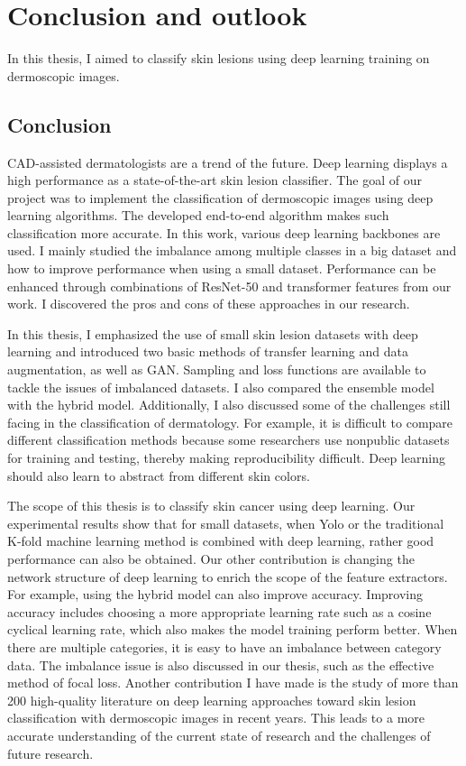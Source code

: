 
\chapter{Conclusion and outlook} \label{ch:conclusion}

In this thesis, I aimed to classify skin lesions using deep learning training on dermoscopic images.  
   

\section{Conclusion}
CAD-assisted dermatologists are a trend of the future. Deep learning displays a high performance as a state-of-the-art skin lesion classifier. The goal of our project was to implement the classification of dermoscopic images using deep learning algorithms. The developed end-to-end algorithm makes such classification more accurate. In this work, various deep learning backbones are used. I mainly studied the imbalance among multiple classes in a big dataset and how to improve performance when using a small dataset. Performance can be enhanced through combinations of ResNet-50 and transformer features from our work. I discovered the pros and cons of these approaches in our research. 

In this thesis, I emphasized the use of small skin lesion datasets with deep learning and introduced two basic methods of transfer learning and data augmentation, as well as GAN. Sampling and loss functions are available to tackle the issues of imbalanced datasets. I also compared the ensemble model with the hybrid model. Additionally, I also discussed some of the challenges still facing in the classification of dermatology. For example, it is difficult to compare different classification methods because some researchers use nonpublic datasets for training and testing, thereby making reproducibility difficult. Deep learning should also learn to abstract from different skin colors. 

The scope of this thesis is to classify skin cancer using deep learning. Our experimental results show that for small datasets, when Yolo or the traditional K-fold machine learning method is combined with deep learning, rather good performance can also be obtained. Our other contribution is changing the network structure of deep learning to enrich the scope of the feature extractors. For example, using the hybrid model can also improve accuracy. Improving accuracy includes choosing a more appropriate learning rate such as a cosine cyclical learning rate, which also makes the model training perform better. When there are multiple categories, it is easy to have an imbalance between category data. The imbalance issue is also discussed in our thesis, such as the effective method of focal loss. Another contribution I have made is the study of more than 200 high-quality literature on deep learning approaches toward skin lesion classification with dermoscopic images in recent years. This leads to a more accurate understanding of the current state of research and the challenges of future research.


